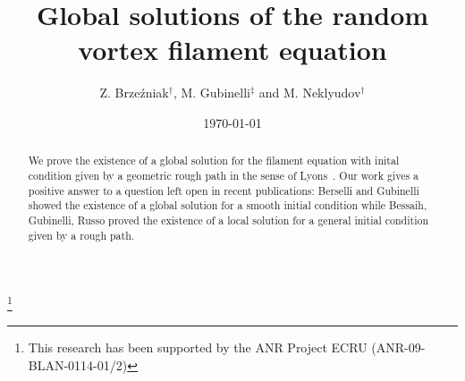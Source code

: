 \documentclass[11pt,a4paper,reqno]{amsart}%
\theoremstyle{plain}
\theoremstyle{remark}
\theoremstyle{plain}
\numberwithin{equation}{section}
\begin{document}
\title{Global solutions of the random vortex filament equation}

\author{Z. Brze\'{z}niak$^\dag$, M. Gubinelli$^\ddag$ and
M. Neklyudov$^\dag$}

\address{
$^\dag$Department of Mathematics, University of York, Heslington,
UK
\\
$^\ddag$CEREMADE \& CNRS UMR 7534, Universit\'e Paris-Dauphine,  France
}

\thanks{This research has been supported by the ANR Project ECRU (ANR-09-BLAN-0114-01/2)}



\date{\today}

\begin{abstract}
We prove the existence of a global solution for the
 filament equation with inital condition given by a geometric rough path in the sense of Lyons~\cite{[Lyons-1998]}. Our work gives a positive answer to a question left open in recent publications: Berselli and  Gubinelli \cite{[Bers+Gub_2007]}  showed the existence of a global solution for a smooth  initial condition  while  Bessaih, Gubinelli, Russo \cite{[Bess+Gub_2005]} proved the existence of a local solution for a general  initial condition given by a rough path.
\end{abstract}


\maketitle
\end{document}
